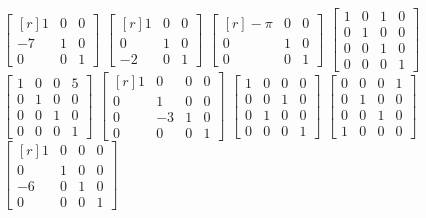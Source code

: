 \begin{tasks}[
    start=164,
    style=enumerate,
    label-offset = 4mm,
    ]
    \task $\begin{bmatrix*}[r]1 & 0 & 0 \\ -7 & 1 & 0 \\ 0 & 0 & 1\end{bmatrix*}$
    \task $\begin{bmatrix*}[r]1 & 0 & 0 \\ 0 & 1 & 0 \\ -2 & 0 & 1\end{bmatrix*}$
    \task $\begin{bmatrix*}[r]-\pi & 0 & 0 \\ 0 & 1 & 0 \\ 0 & 0 & 1\end{bmatrix*}$
    \task $\begin{bmatrix*}1 & 0 & 1 & 0 \\ 0 & 1 & 0 & 0 \\ 0 & 0 & 1 & 0 \\ 0 & 0 & 0 & 1\end{bmatrix*}$
    \task $\begin{bmatrix*}1 & 0 & 0 & 5 \\ 0 & 1 & 0 & 0 \\ 0 & 0 & 1 & 0 \\ 0 & 0 & 0 & 1\end{bmatrix*}$
    \task $\begin{bmatrix*}[r]1 & 0 & 0 & 0 \\ 0 & 1 & 0 & 0 \\ 0 & -3 & 1 & 0 \\ 0 & 0 & 0 & 1\end{bmatrix*}$
    \task $\begin{bmatrix*}1 & 0 & 0 & 0 \\ 0 & 0 & 1 & 0 \\ 0 & 1 & 0 & 0 \\ 0 & 0 & 0 & 1\end{bmatrix*}$
    \task $\begin{bmatrix*}0 & 0 & 0 & 1 \\ 0 & 1 & 0 & 0 \\ 0 & 0 & 1 & 0 \\ 1 & 0 & 0 & 0\end{bmatrix*}$
    \task $\begin{bmatrix*}[r]1 & 0 & 0 & 0 \\ 0 & 1 & 0 & 0 \\ -6 & 0 & 1 & 0 \\ 0 & 0 & 0 & 1\end{bmatrix*}$
\end{tasks}
